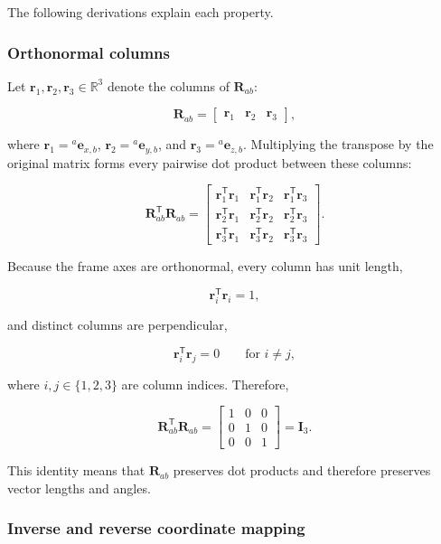 \documentclass[
  australian,
  12pt,
  letterpaper,
  DIV=11,
  numbers=noendperiod,
  twoside]{scrreprt}
\begin{document}
The following derivations explain each property.

\subsubsection{Orthonormal columns}\label{orthonormal-columns}

Let \(\mathbf r_1,\mathbf r_2,\mathbf r_3\in\mathbb R^3\) denote the
columns of \(\mathbf R_{ab}\):

\[
\mathbf R_{ab}
=
\begin{bmatrix}
\mathbf r_1 & \mathbf r_2 & \mathbf r_3
\end{bmatrix},
\]

where \(\mathbf r_1={}^{a}\mathbf e_{x,b}\),
\(\mathbf r_2={}^{a}\mathbf e_{y,b}\), and
\(\mathbf r_3={}^{a}\mathbf e_{z,b}\). Multiplying the transpose by the
original matrix forms every pairwise dot product between these columns:

\[
\mathbf R_{ab}^{\mathsf T}\mathbf R_{ab}
=
\begin{bmatrix}
\mathbf r_1^{\mathsf T}\mathbf r_1 & \mathbf r_1^{\mathsf T}\mathbf r_2 & \mathbf r_1^{\mathsf T}\mathbf r_3\\
\mathbf r_2^{\mathsf T}\mathbf r_1 & \mathbf r_2^{\mathsf T}\mathbf r_2 & \mathbf r_2^{\mathsf T}\mathbf r_3\\
\mathbf r_3^{\mathsf T}\mathbf r_1 & \mathbf r_3^{\mathsf T}\mathbf r_2 & \mathbf r_3^{\mathsf T}\mathbf r_3
\end{bmatrix}.
\]

Because the frame axes are orthonormal, every column has unit length,

\[
\mathbf r_i^{\mathsf T}\mathbf r_i=1,
\]

and distinct columns are perpendicular,

\[
\mathbf r_i^{\mathsf T}\mathbf r_j=0
\qquad\text{for }i\neq j,
\]

where \(i,j\in\{1,2,3\}\) are column indices. Therefore,

\[
\boxed{
\mathbf R_{ab}^{\mathsf T}\mathbf R_{ab}
=
\begin{bmatrix}
1&0&0\\
0&1&0\\
0&0&1
\end{bmatrix}
=
\mathbf I_3
}.
\]

This identity means that \(\mathbf R_{ab}\) preserves dot products and
therefore preserves vector lengths and angles.

\subsubsection{Inverse and reverse coordinate
mapping}\label{inverse-and-reverse-coordinate-mapping}
\end{document}
